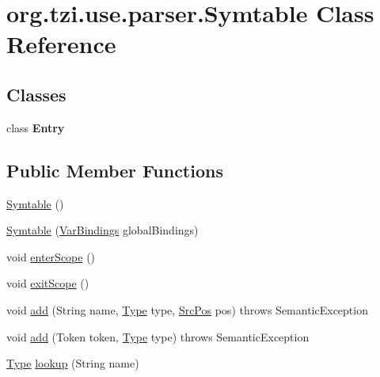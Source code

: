 \hypertarget{classorg_1_1tzi_1_1use_1_1parser_1_1_symtable}{\section{org.\-tzi.\-use.\-parser.\-Symtable Class Reference}
\label{classorg_1_1tzi_1_1use_1_1parser_1_1_symtable}
}
\subsection*{Classes}
\begin{DoxyCompactItemize}
\item 
class {\bfseries Entry}
\end{DoxyCompactItemize}
\subsection*{Public Member Functions}
\begin{DoxyCompactItemize}
\item 
\hyperlink{classorg_1_1tzi_1_1use_1_1parser_1_1_symtable_a3b29fa6b36edc5aa196361401a343d0e}{Symtable} ()
\item 
\hyperlink{classorg_1_1tzi_1_1use_1_1parser_1_1_symtable_a45547124a0fd2034c1b06835522b402d}{Symtable} (\hyperlink{classorg_1_1tzi_1_1use_1_1uml_1_1ocl_1_1value_1_1_var_bindings}{Var\-Bindings} global\-Bindings)
\item 
void \hyperlink{classorg_1_1tzi_1_1use_1_1parser_1_1_symtable_a63973bedeba74cca76d0f99ef7e01898}{enter\-Scope} ()
\item 
void \hyperlink{classorg_1_1tzi_1_1use_1_1parser_1_1_symtable_ae2d3214763a4df8c6156364960ea12c4}{exit\-Scope} ()
\item 
void \hyperlink{classorg_1_1tzi_1_1use_1_1parser_1_1_symtable_ae7121978138879f19a60db2b2ae2b421}{add} (String name, \hyperlink{interfaceorg_1_1tzi_1_1use_1_1uml_1_1ocl_1_1type_1_1_type}{Type} type, \hyperlink{classorg_1_1tzi_1_1use_1_1parser_1_1_src_pos}{Src\-Pos} pos)  throws Semantic\-Exception 
\item 
void \hyperlink{classorg_1_1tzi_1_1use_1_1parser_1_1_symtable_a88edf95ac1d70a702953b11701c1921d}{add} (Token token, \hyperlink{interfaceorg_1_1tzi_1_1use_1_1uml_1_1ocl_1_1type_1_1_type}{Type} type)  throws Semantic\-Exception      
\item 
\hyperlink{interfaceorg_1_1tzi_1_1use_1_1uml_1_1ocl_1_1type_1_1_type}{Type} \hyperlink{classorg_1_1tzi_1_1use_1_1parser_1_1_symtable_ace7327ff2a156bf28f460e5a4dad7277}{lookup} (String name)
\end{DoxyCompactItemize}


